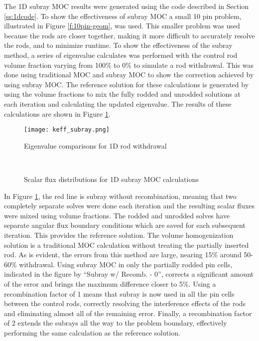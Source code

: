 The 1D subray MOC results were generated using the code described in Section \ref{ss:1dcode}.  To show the effectiveness of subray MOC a small 10 pin problem, illustrated in Figure \ref{f:10pin-geom}, was used.  This smaller problem was used because the rods are closer together, making it more difficult to accurately resolve the rods, and to minimize runtime.  To show the effectiveness of the subray method, a series of eigenvalue calculates was performed with the control rod volume fraction varying from 100\% to 0\% to simulate a rod withdrawal.  This was done using traditional MOC and subray MOC to show the correction achieved by using subray MOC.  The reference solution for these calculations is generated by using the volume fractions to mix the fully rodded and unrodded solutions at each iteration and calculating the updated eigenvalue.  The results of these calculations are shown in Figure \ref{f:1d-subray-keff}.

\begin{figure}[h]
    \centering
    \texttt{[image: keff\_subray.png]}
    \caption{Eigenvalue comparisons for 1D rod withdrawal}\label{f:1d-subray-keff}
\end{figure}

\begin{figure}[!htb]
    \centering
    ~
    \caption{Scalar flux distributions for 1D subray MOC calculations}\label{f:1d-subray-scalflux}
\end{figure}

In Figure \ref{f:1d-subray-keff}, the red line is subray without recombination, meaning that two completely separate solves were done each iteration and the resulting scalar fluxes were mixed using volume fractions.  The rodded and unrodded solves have separate angular flux boundary conditions which are saved for each subsequent iteration.  This provides the reference solution.  The volume homogenization solution is a traditional MOC calculation without treating the partially inserted rod.  As is evident, the errors from this method are large, nearing 15\% around 50-60\% withdrawal.  Using subray MOC in only the partially rodded pin cells, indicated in the figure by ``Subray w/ Recomb. - 0'', corrects a significant amount of the error and brings the maximum difference closer to 5\%.  Using a recombination factor of 1 means that subray is now used in all the pin cells between the control rods, correctly resolving the interference effects of the rods and eliminating almost all of the remaining error.  Finally, a recombination factor of 2 extends the subrays all the way to the problem boundary, effectively performing the same calculation as the reference solution.

